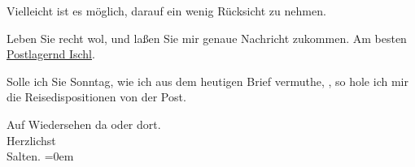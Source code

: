 \pstart
           Vielleicht ist es möglich, darauf ein wenig Rücksicht zu nehmen.\pend
           
\pstart
           {\pb}Leben Sie recht wol, und
               laßen Sie mir genaue Nachricht zukommen. Am besten \uline{Postlagernd Ischl}.\pend
           
\pstart
           Solle ich Sie Sonntag, wie ich aus dem heutigen Brief
               vermuthe, \label{K_L03308-4v}\label{K_L03308-4}, so hole ich mir die
               Reisedispositionen von der Post.\pend
           
\pstart
           Auf Wiedersehen da oder dort. {\\[\baselineskip]}Herzlichst {\\[\baselineskip]}\spacefill\mbox{Salten.}\pend
           \leftskip=0em{}\endnumbering{}  \newcommand{\dateiname}{L03308}\newcommand{\titel}{Felix Salten an Arthur Schnitzler, 7. 8. 1900}\newcommand{\editorInnen}{Martin Anton Müller und Laura Untner}
